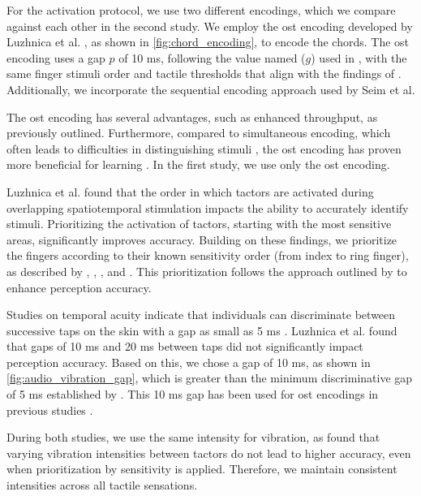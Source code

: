 For the activation protocol, we use two different encodings, which we compare against each other in the second study. We employ the \gls{ost} encoding developed by Luzhnica et al. \cite{Luzhnica2018, Luzhnica2018a, Luzhnica2017, Luzhnica2016}, as shown in \autoref{fig:chord_encoding}, to encode the chords. The \gls{ost} encoding uses a gap $p$ of 10 ms, following the value named ($g$) used in \cite{Luzhnica2018}, with the same finger stimuli order and tactile thresholds that align with the findings of \cite{Duncan2007}. Additionally, we incorporate the sequential encoding approach used by Seim et al.

The \gls{ost} encoding has several advantages, such as enhanced throughput, as previously outlined. Furthermore, compared to simultaneous encoding, which often leads to difficulties in distinguishing stimuli \cite{Seim2014}, the \gls{ost} encoding has proven more beneficial for learning \cite{Luzhnica2018}. In the first study, we use only the \gls{ost} encoding.

Luzhnica et al. \cite{Luzhnica2017} found that the order in which tactors are activated during overlapping spatiotemporal stimulation impacts the ability to accurately identify stimuli. Prioritizing the activation of tactors, starting with the most sensitive areas, significantly improves accuracy. Building on these findings, we prioritize the fingers according to their known sensitivity order (from index to ring finger), as described by \cite{Luzhnica2017}, \cite{Hoggan2007}, \cite{VegaBermudez2001}, and \cite{Duncan2007}. This prioritization follows the approach outlined by \cite{Luzhnica2017} to enhance perception accuracy.

Studies on temporal acuity indicate that individuals can discriminate between successive taps on the skin with a gap as small as 5 ms \cite{Luzhnica2017, Katz2013}. Luzhnica et al. found that gaps of 10 ms and 20 ms between taps did not significantly impact perception accuracy. Based on this, we chose a gap of 10 ms, as shown in \autoref{fig:audio_vibration_gap}, which is greater than the minimum discriminative gap of 5 ms established by \cite{Luzhnica2017}. This 10 ms gap has been used for \gls{ost} encodings in previous studies \cite{Luzhnica2018, Luzhnica2016}.

During both studies, we use the same intensity for vibration, as \cite{Luzhnica2017} found that varying vibration intensities between tactors do not lead to higher accuracy, even when prioritization by sensitivity is applied. Therefore, we maintain consistent intensities across all tactile sensations.

